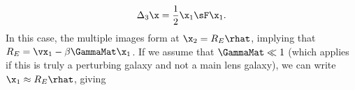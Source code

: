 \begin{equation}
\Delta_3 \x = \frac{1}{2} \x_1 \sF \x_1.
\end{equation}
In this case, the multiple images form at $\x_2 = R_E \rhat$, implying that $R_E = \vx_1 - \beta \GammaMat \x_1$. If we assume that $\GammaMat \ll 1$ (which applies if this is truly a perturbing galaxy and not a main lens galaxy), we can write $\x_1 \approx R_E \rhat$, giving
  